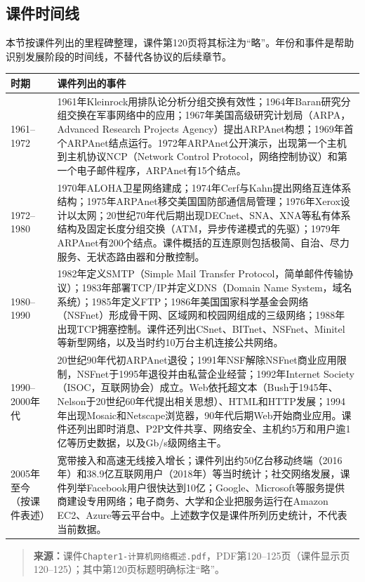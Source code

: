 \subsection{课件时间线}

本节按课件列出的里程碑整理，课件第120页将其标注为“略”。年份和事件是帮助识别发展阶段的时间线，不替代各协议的后续章节。

\begin{center}\small
\begin{tabularx}{0.96\textwidth}{l X}
\toprule
时期 & 课件列出的事件\\
\midrule
1961--1972 & 1961年Kleinrock用排队论分析分组交换有效性；1964年Baran研究分组交换在军事网络中的应用；1967年美国高级研究计划局（ARPA，Advanced Research Projects Agency）提出ARPAnet构想；1969年首个ARPAnet结点运行。1972年ARPAnet公开演示，出现第一个主机到主机协议NCP（Network Control Protocol，网络控制协议）和第一个电子邮件程序，ARPAnet有15个结点。\\
1972--1980 & 1970年ALOHA卫星网络建成；1974年Cerf与Kahn提出网络互连体系结构；1975年ARPAnet移交美国国防部通信局管理；1976年Xerox设计以太网；20世纪70年代后期出现DECnet、SNA、XNA等私有体系结构及固定长度分组交换（ATM，异步传递模式的先驱）；1979年ARPAnet有200个结点。课件概括的互连原则包括极简、自治、尽力服务、无状态路由器和分散控制。\\
1980--1990 & 1982年定义SMTP（Simple Mail Transfer Protocol，简单邮件传输协议）；1983年部署TCP/IP并定义DNS（Domain Name System，域名系统）；1985年定义FTP；1986年美国国家科学基金会网络（NSFnet）形成骨干网、区域网和校园网组成的三级网络；1988年出现TCP拥塞控制。课件还列出CSnet、BITnet、NSFnet、Minitel等新型网络，以及当时约10万台主机连接公共网络。\\
1990--2000年代 & 20世纪90年代初ARPAnet退役；1991年NSF解除NSFnet商业应用限制，NSFnet于1995年退役并由私营企业经营；1992年Internet Society（ISOC，互联网协会）成立。Web依托超文本（Bush于1945年、Nelson于20世纪60年代提出相关思想）、HTML和HTTP发展；1994年出现Mosaic和Netscape浏览器，90年代后期Web开始商业应用。课件还列出即时消息、P2P文件共享、网络安全、主机约5万和用户逾1亿等历史数据，以及Gb/s级网络主干。\\
2005年至今（按课件表述） & 宽带接入和高速无线接入增长；课件列出约50亿台移动终端（2016年）和38.9亿互联网用户（2018年）等当时统计；社交网络发展，课件列举Facebook用户很快达到10亿；Google、Microsoft等服务提供商建设专用网络；电子商务、大学和企业把服务运行在Amazon EC2、Azure等云平台中。上述数字仅是课件所列历史统计，不代表当前数据。\\
\bottomrule
\end{tabularx}
\end{center}

\begin{quote}\small\textbf{来源：}课件\texttt{Chapter1-计算机网络概述.pdf}，PDF第120--125页（课件显示页120--125）；其中第120页标题明确标注“略”。\end{quote}

